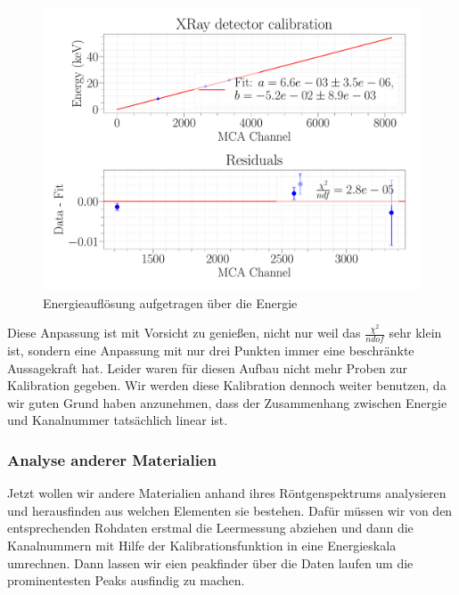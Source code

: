 \documentclass[a4paper,14pt]{article}
\begin{document}
\begin{figure}[H]
\centering
\includegraphics[scale=0.25]{../Figures/XRay-calibration-fit.pdf}
\caption{Energieauflösung aufgetragen über die Energie}
\label{XRay_calibration}
\end{figure}

Diese Anpassung ist mit Vorsicht zu genießen, nicht nur weil das $\frac{\chi^2}{ndof}$ sehr klein ist, sondern eine Anpassung mit nur drei Punkten immer eine beschränkte Aussagekraft hat. Leider waren für diesen Aufbau nicht mehr Proben zur Kalibration gegeben. Wir werden diese Kalibration dennoch weiter benutzen, da wir guten Grund haben anzunehmen, dass der Zusammenhang zwischen Energie und Kanalnummer tatsächlich linear ist.

\subsubsection{Analyse anderer Materialien}
Jetzt wollen wir andere Materialien  anhand ihres Röntgenspektrums analysieren und herausfinden aus welchen Elementen sie bestehen. Dafür müssen wir von den entsprechenden Rohdaten erstmal die Leermessung abziehen und dann die Kanalnummern mit Hilfe der Kalibrationsfunktion in eine Energieskala umrechnen. Dann lassen wir eien peakfinder über die Daten laufen um die prominentesten Peaks ausfindig zu machen.
\end{document}
